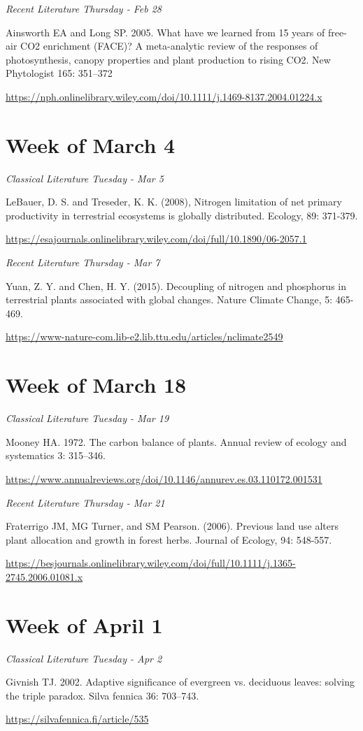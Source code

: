 \documentclass[12pt, notitlepage]{article}   	%
\begin{document}
{\textit{Recent Literature Thursday - Feb 28} \par
Ainsworth EA and Long SP. 2005. 
What have we learned from 15 years of free-air CO2 enrichment (FACE)? 
A meta-analytic review of the responses of photosynthesis, canopy properties and 
plant production to rising CO2. New Phytologist 165: 351–372 \par
\url{https://nph.onlinelibrary.wiley.com/doi/10.1111/j.1469-8137.2004.01224.x}

\section*{Week of March 4}
\textit{Classical Literature Tuesday - Mar 5} \par
LeBauer, D. S. and Treseder, K. K. (2008), Nitrogen limitation of net primary productivity
in terrestrial ecosystems is globally distributed. Ecology, 89: 371-379. \par
\url{https://esajournals.onlinelibrary.wiley.com/doi/full/10.1890/06-2057.1}

\textit{Recent Literature Thursday - Mar 7} \par
Yuan, Z. Y. and Chen, H. Y. (2015). Decoupling of nitrogen and phosphorus in terrestrial 
plants associated with global changes. Nature Climate Change, 5: 465-469. \par
\url{https://www-nature-com.lib-e2.lib.ttu.edu/articles/nclimate2549}

\section*{Week of March 18}
\textit{Classical Literature Tuesday - Mar 19} \par
Mooney HA. 1972. The carbon balance of plants. 
Annual review of ecology and systematics 3: 315–346. \par
\url{https://www.annualreviews.org/doi/10.1146/annurev.es.03.110172.001531}

\textit{Recent Literature Thursday - Mar 21} \par
Fraterrigo JM, MG Turner, and SM Pearson. (2006). 
Previous land use alters plant allocation and growth in forest herbs. 
Journal of Ecology, 94: 548-557. \par
\url{https://besjournals.onlinelibrary.wiley.com/doi/full/10.1111/j.1365-2745.2006.01081.x}

\section*{Week of April 1}
\textit{Classical Literature Tuesday - Apr 2} \par
Givnish TJ. 2002. Adaptive significance of evergreen vs. deciduous leaves: 
solving the triple paradox. Silva fennica 36: 703–743. \par
\url{https://silvafennica.fi/article/535}

}
\end{document}
